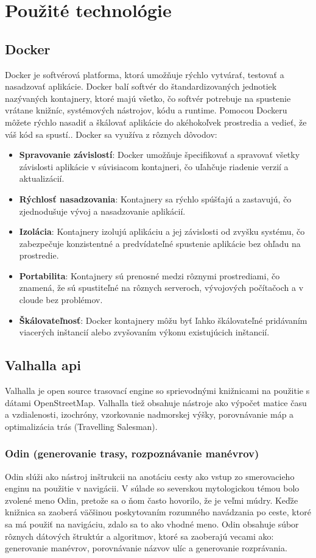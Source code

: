 \section{Použité technológie}
\subsection{Docker}
Docker je softvérová platforma, ktorá umožňuje rýchlo vytvárať, testovať a nasadzovať aplikácie. Docker balí softvér do štandardizovaných jednotiek nazývaných kontajnery, ktoré majú všetko, čo softvér potrebuje na spustenie vrátane knižníc, systémových nástrojov, kódu a runtime. Pomocou Dockeru môžete rýchlo nasadiť a škálovať aplikácie do akéhokoľvek prostredia a vedieť, že váš kód sa spustí.\cite{docker}. Docker sa využíva z rôznych dôvodov\cite{whyDocker}: 
\begin{itemize}
    \item \textbf{Spravovanie závislostí}: Docker umožňuje špecifikovať a spravovať všetky závislosti aplikácie v súvisiacom kontajneri, čo uľahčuje riadenie verzií a aktualizácií.
    \item \textbf{Rýchlosť nasadzovania}: Kontajnery sa rýchlo spúšťajú a zastavujú, čo zjednodušuje vývoj a nasadzovanie aplikácií.
    \item \textbf{Izolácia}: Kontajnery izolujú aplikáciu a jej závislosti od zvyšku systému, čo zabezpečuje konzistentné a predvídateľné spustenie aplikácie bez ohľadu na prostredie.
    \item \textbf{Portabilita}: Kontajnery sú prenosné medzi rôznymi prostrediami, čo znamená, že sú spustiteľné na rôznych serveroch, vývojových počítačoch a v cloude bez problémov.
    \item \textbf{Škálovateľnosť}: Docker kontajnery môžu byť ľahko škálovateľné pridávaním viacerých inštancií alebo zvyšovaním výkonu existujúcich inštancií.
\end{itemize}
\subsection{Valhalla api \label{section:valhalla}}
Valhalla je open source trasovací engine so sprievodnými knižnicami na použitie s dátami OpenStreetMap. Valhalla tiež obsahuje nástroje ako výpočet matice času a vzdialenosti, izochróny, vzorkovanie nadmorskej výšky, porovnávanie máp a optimalizácia trás (Travelling Salesman)\cite{valhalla}.
\subsubsection{Odin (generovanie trasy, rozpoznávanie manévrov)}
Odin slúži ako nástroj inštrukcii na anotáciu cesty ako vstup zo smerovacieho enginu na použitie v navigácii. V súlade so severskou mytologickou témou bolo zvolené meno Odin, pretože sa o ňom často hovorilo, že je veľmi múdry. Keďže knižnica sa zaoberá väčšinou poskytovaním rozumného navádzania po ceste, ktoré sa má použiť na navigáciu, zdalo sa to ako vhodné meno. Odin obsahuje súbor rôznych dátových štruktúr a algoritmov, ktoré sa zaoberajú vecami ako: generovanie manévrov, porovnávanie názvov ulíc a generovanie rozprávania. \cite{odin}
